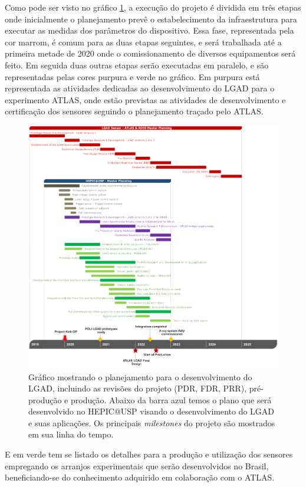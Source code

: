 Como pode ser visto no gráfico \ref{cronograma}, a execução do projeto é dividida em três etapas onde inicialmente o planejamento prevê o estabelecimento da infraestrutura para executar as medidas dos parâmetros do dispositivo. Essa fase, representada pela cor marrom, é comum para as duas etapas seguintes, e será trabalhada até a primeira metade de 2020 onde o comissionamento de diversos equipamentos será feito. Em seguida duas outras etapas serão executadas em paralelo, e são representadas pelas cores purpura e verde no gráfico. Em purpura está representada as atividades dedicadas ao desenvolvimento do LGAD para o experimento ATLAS, onde estão previstas as atividades de desenvolvimento e certificação dos sensores seguindo o planejamento traçado pelo ATLAS.
\begin{figure}
    \centering
    \includegraphics[width=18.0cm]{assets/cronograma.png}
    \caption{Gráfico mostrando o planejamento para o desenvolvimento do LGAD, incluindo as revisões do projeto (PDR, FDR, PRR), pré-produção e produção. Abaixo da barra azul temos o plano que será desenvolvido no HEPIC@USP visando o desenvolvimento do LGAD e suas aplicações. Os principais {\it milestones} do projeto são mostrados em sua linha do tempo.}
    \label{cronograma}
\end{figure}
E em verde tem se listado os detalhes para a produção e utilização dos sensores empregando os arranjos experimentais que serão desenvolvidos no Brasil, beneficiando-se do conhecimento adquirido em colaboração com o ATLAS.

